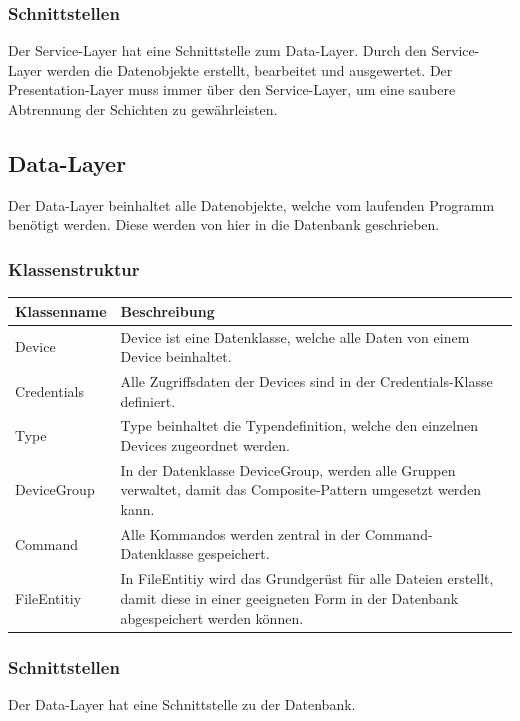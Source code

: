 \subsubsection{Schnittstellen}
Der Service-Layer hat eine Schnittstelle zum Data-Layer. Durch den Service-Layer werden die Datenobjekte erstellt, bearbeitet und ausgewertet. Der Presentation-Layer muss immer über den Service-Layer, um eine saubere Abtrennung der Schichten zu gewährleisten.

\subsection{Data-Layer}
Der Data-Layer beinhaltet alle Datenobjekte, welche vom laufenden Programm benötigt werden. Diese werden von hier in die Datenbank geschrieben.
\subsubsection{Klassenstruktur}
\begin{table}[H]
\centering
    \begin{tabular}{@{}l p{14.1cm} @{}}\toprule    
    {Klassenname} & {Beschreibung}\\ \midrule
    Device & Device ist eine Datenklasse, welche alle Daten von einem Device beinhaltet.\\
    Credentials & Alle Zugriffsdaten der Devices sind in der Credentials-Klasse definiert. \\
    Type & Type beinhaltet die Typendefinition, welche den einzelnen Devices zugeordnet werden. \\
    DeviceGroup & In der Datenklasse DeviceGroup, werden alle Gruppen verwaltet, damit das Composite-Pattern umgesetzt werden kann.\\
    Command & Alle Kommandos werden zentral in der Command-Datenklasse gespeichert.\\
    FileEntitiy & In FileEntitiy wird das Grundgerüst für alle Dateien erstellt, damit diese in einer geeigneten Form in der Datenbank abgespeichert werden können.\\ 
    \bottomrule
    \end{tabular}
\end{table}
\subsubsection{Schnittstellen}
Der Data-Layer hat eine Schnittstelle zu der Datenbank.